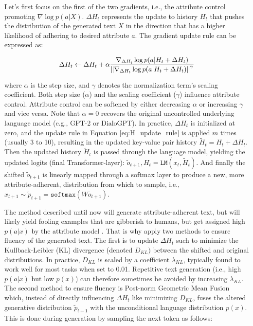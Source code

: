 Let's first focus on the first of the two gradients, i.e., the attribute control promoting $\nabla \log p(a | X)$. $\Delta H_t$ represents the update to history $H_t$ that pushes the distribution of the generated text $X$ in the direction that has a higher likelihood of adhering to desired attribute $a$. The gradient update rule can be expressed as:

\begin{equation}
    \Delta H_t \leftarrow \Delta H_t + \alpha
    \frac{\nabla_{\Delta H_t} \log p(a | H_t + \Delta H_t)}
    {\norm{\nabla_{\Delta H_t} \log p(a | H_t + \Delta H_t)}^{\gamma}}
\label{eq:H_update_rule}
\end{equation}

where $\alpha$ is the step size, and $\gamma$ denotes the normalization term's scaling coefficient. Both step size ($\alpha$) and the scaling coefficient ($\gamma$) influence attribute control. Attribute control can be softened by either decreasing $\alpha$ or increasing $\gamma$ and vice versa. Note that $\alpha = 0$ recovers the original uncontrolled underlying language model (e.g., GPT-2 or DialoGPT). In practice, $\Delta H_t$ is initialized at zero, and the update rule in Equation \ref{eq:H_update_rule} is applied $m$ times (usually 3 to 10), resulting in the updated key-value pair history $\tilde{H}_t  = H_t + \Delta H_t$. Then the updated history $\tilde{H}_t$ is passed through the language model, yielding the updated logits (final Transformer-layer): $\tilde{o}_{t + 1}, H_t = \texttt{LM}(x_t, \tilde{H}_t)$. And finally the shifted $\tilde{o}_{t + 1}$ is linearly mapped through a softmax layer to produce a new, more attribute-adherent, distribution from which to sample, i.e., $x_{t + 1} \sim \tilde{p}_{t + 1} = \texttt{softmax} \left( W \tilde{o}_{t + 1} \right)$.

The method described until now will generate attribute-adherent text, but will likely yield fooling examples \citep{nguyen2015deep} that are gibberish to humans, but get assigned high $p(a | x)$ by the attribute model \citep{dathathri2019plug}. That is why \cite{dathathri2019plug} apply two methods to ensure fluency of the generated text. The first is to update $\Delta H_t$ such to minimize the Kullback-Leibler (KL) divergence (denoted $D_{KL})$ between the shifted and original distributions. In practice, $D_{KL}$ is scaled by a coefficient $\lambda_{KL}$, typically found to work well for most tasks when set to 0.01. Repetitive text generation (i.e., high $p(a | x)$ but low $p(x)$) can therefore sometimes be avoided by increasing $\lambda_{KL}$. The second method to ensure fluency is Post-norm Geometric Mean Fusion \citep{stahlberg-etal-2018-simple} which, instead of directly influencing $\Delta H_t$ like minimizing $D_{KL}$, fuses the altered generative distribution $\tilde{p}_{t + 1}$ with the unconditional language distribution $p(x)$. This is done during generation by sampling the next token as follows:


